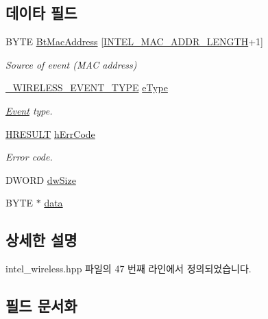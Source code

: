 \subsection*{데이타 필드}
\begin{DoxyCompactItemize}
\item 
B\+Y\+TE \hyperlink{struct_i_n_t_e_l___e_v_e_n_t_a0fd0944150b35bbbb46236f7dfca2120}{Bt\+Mac\+Address} \mbox{[}\hyperlink{intel__wireless_8hpp_aab812d76eb534e1bf8fa9338c1fa97ff}{I\+N\+T\+E\+L\+\_\+\+M\+A\+C\+\_\+\+A\+D\+D\+R\+\_\+\+L\+E\+N\+G\+TH}+1\mbox{]}
\begin{DoxyCompactList}\small\item\em Source of event (M\+AC address) \end{DoxyCompactList}\item 
\hyperlink{wireless__tstamper_8hpp_a26f76f9ae9b26301e7413c7c9dde0f55}{\+\_\+\+W\+I\+R\+E\+L\+E\+S\+S\+\_\+\+E\+V\+E\+N\+T\+\_\+\+T\+Y\+PE} \hyperlink{struct_i_n_t_e_l___e_v_e_n_t_adfd2791bfb7c2d0237bbe21117619d0b}{e\+Type}
\begin{DoxyCompactList}\small\item\em \hyperlink{class_event}{Event} type. \end{DoxyCompactList}\item 
\hyperlink{intel__wireless_8hpp_a4b9f04712401369cc485ad4aa4555320}{H\+R\+E\+S\+U\+LT} \hyperlink{struct_i_n_t_e_l___e_v_e_n_t_a173bc1d75833b72f9f73122e7d9b74e6}{h\+Err\+Code}
\begin{DoxyCompactList}\small\item\em Error code. \end{DoxyCompactList}\item 
D\+W\+O\+RD \hyperlink{struct_i_n_t_e_l___e_v_e_n_t_a669c5a85f5a9eb97e64ad880fadaaa2d}{dw\+Size}
\item 
B\+Y\+TE $\ast$ \hyperlink{struct_i_n_t_e_l___e_v_e_n_t_a3d1ef01c0aa6dd4984364db3f2d26fd2}{data}
\end{DoxyCompactItemize}


\subsection{상세한 설명}


intel\+\_\+wireless.\+hpp 파일의 47 번째 라인에서 정의되었습니다.



\subsection{필드 문서화}
